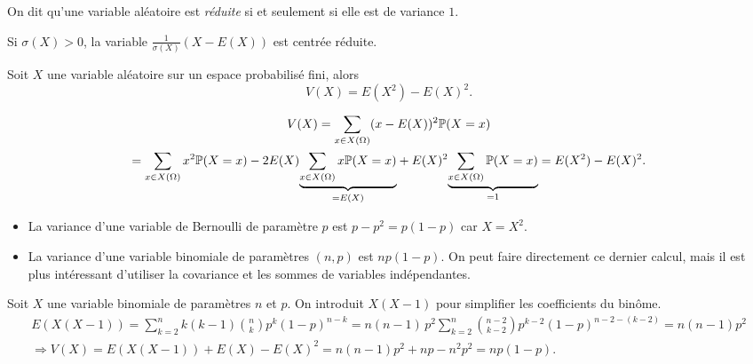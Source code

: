 \begin{defi}
 On dit qu'une variable aléatoire est \emph{réduite} si et seulement si elle est de variance $1$.
\end{defi}
\begin{rem}
 Si $\sigma(X)>0$, la variable $\frac{1}{\sigma(X)}\left(X -E(X) \right)$ est centrée réduite.
\end{rem}

\begin{prop}
Soit $X$ une variable aléatoire sur un espace probabilisé fini, alors
\begin{displaymath}
 V(X) = E(X^2) -E(X)^2.
\end{displaymath}
\end{prop}
\begin{demo}
 \begin{multline*}
V(X)= \sum_{x\in X(\Omega)}(x-E(X))^2\mathbb{P}(X=x)\\
= \sum_{x\in X(\Omega)}x^2 \mathbb{P}(X=x) 
-2E(X)\underset{=E(X)}{\underbrace{\sum_{x\in X(\Omega)}x\mathbb{P}(X=x)}} 
+ E(X)^2\underset{=1}{\underbrace{\sum_{x\in X(\Omega)}\mathbb{P}(X=x)}}
=E(X^2)-E(X)^2.
 \end{multline*}
\end{demo}

\begin{exples}
 \begin{itemize}
  \item La variance d'une variable de Bernoulli de paramètre $p$ est $p-p^2 = p(1-p)$ car $X=X^2$.
  \item La variance d'une variable binomiale de paramètres $(n,p)$ est $n p(1-p)$. On peut faire directement ce dernier calcul, mais il est plus intéressant d'utiliser la covariance et les sommes de variables indépendantes.
 \end{itemize}
\end{exples}
\begin{demo}
  Soit $X$ une variable binomiale de paramètres $n$ et $p$. On introduit $X(X-1)$ pour simplifier les coefficients du binôme.
\begin{multline*}
E(X(X-1)) = \sum_{k=2}^{n}k(k-1)\binom{n}{k}p^k(1-p)^{n-k} 
= n(n-1)\,p^2\sum_{k=2}^{n}\binom{n-2}{k-2}p^{k-2}(1-p)^{n-2-(k-2)} = n(n-1)p^2\\
\Rightarrow V(X) = E(X(X-1))+E(X)-E(X)^2 = n(n-1)p^2 + np -n^2p^2 = np(1-p).
\end{multline*}

\end{demo}


